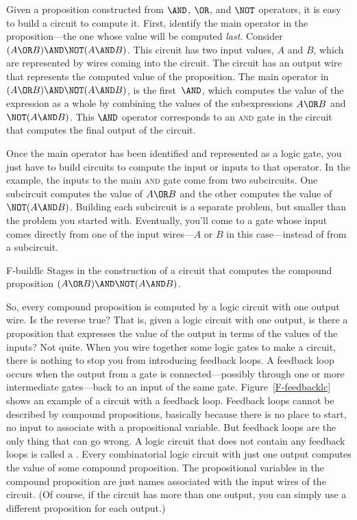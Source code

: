 Given a proposition constructed
from $\AND$, $\OR$, and $\NOT$ operators, it is
easy to build a circuit to compute it.  First, identify the main
operator in the proposition---the one whose value will be
computed \emph{last}.  Consider $(A\OR B)\AND\NOT(A\AND B)$.
This circuit has two input values, $A$ and $B$, which are represented
by wires coming into the circuit.  The circuit has an output wire
that represents the computed value of the proposition.
The main operator in $(A\OR B)\AND\NOT(A\AND B)$,
is the first~$\AND$, which computes the
value of the expression as a whole by combining the values
of the subexpressions $A\OR B$ and $\NOT(A\AND B)$.  This $\AND$
operator corresponds to an \textsc{and} gate in the circuit that
computes the final output of the circuit.

Once the main operator has been identified and represented as
a logic gate, you just have to build circuits to compute the
input or inputs to that operator.  In the  example,
the inputs to the main \textsc{and} gate come from two subcircuits.
One subcircuit computes the value of $A\OR B$ and the other
computes the value of $\NOT(A\AND B)$.  Building each subcircuit
is a separate problem, but smaller than the problem you started
with.  Eventually, you'll come to a gate whose input comes directly
from one of the input wires---$A$ or $B$ in this case---instead of
from a subcircuit.


\fig
   {F-buildlc}
   {Stages in the construction of a circuit that computes
    the compound proposition $(A\OR B)\AND\NOT(A\AND B)$.}
   {}
   
\medbreak
   
So, every compound proposition is computed by a logic circuit
with one output wire.  Is the reverse true?  That is, given
a logic circuit with one output, is there a proposition that
expresses the value of the output in terms of the values of
the inputs?  Not quite.  When you wire together some logic
gates to make a circuit, there is nothing to stop you from
introducing feedback loops.  A feedback loop occurs when
the output from a gate is connected---possibly through one
or more intermediate gates---back to an input of the same gate.
Figure~\ref{F-feedbacklc} shows an example of a circuit with
a feedback loop.
Feedback loops cannot be described by compound propositions,
basically because there is no place to start, no input to
associate with a propositional variable.  But feedback
loops are the only thing that can go wrong.  A logic circuit
that does not contain any feedback loops is called a
.  Every combinatorial
logic circuit with just one output computes the value of
some compound proposition.  The propositional variables in
the compound proposition are just names associated with
the input wires of the circuit.  (Of course, if the circuit has
more than one output, you can simply use a different proposition
for each output.)  

